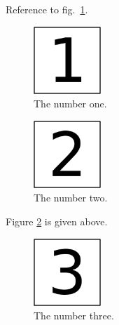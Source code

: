 Reference to fig.~\ref{fig:1}.

\begin{figure}
\hypertarget{fig:1}{%
\centering
\includegraphics[width=1in,height=\textheight]{img/fig-1.png}
\caption{The number one.}\label{fig:1}
}
\end{figure}

\begin{figure}
\hypertarget{fig:2}{%
\centering
\includegraphics[width=1in,height=\textheight]{img/fig-2.png}
\caption{The number two.}\label{fig:2}
}
\end{figure}

Figure \ref{fig:2} is given above.

\begin{figure}
\hypertarget{fig:}{%
\centering
\includegraphics[width=1in,height=\textheight]{img/fig-3.png}
\caption{The number three.}\label{fig:}
}
\end{figure}
